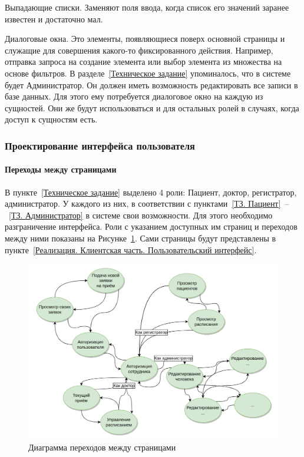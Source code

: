 \documentclass[a4paper,article]{article}
\begin{document}
\begin{sloppypar}
    Выпадающие списки. Заменяют поля ввода, когда список его значений заранее известен и достаточно мал.

    Диалоговые окна. Это элементы, появляющиеся поверх основной страницы и служащие для совершения какого-то фиксированного действия. Например, отправка запроса на создание элемента или выбор элемента из множества на основе фильтров. В разделе~\ref{Техническое задание} упоминалось, что в системе будет Администратор. Он должен иметь возможность редактировать все записи в базе данных. Для этого ему потребуется диалоговое окно на каждую из сущностей. Они же будут использоваться и для остальных ролей в случаях, когда доступ к сущностям есть.

    \subsubsection{Проектирование интерфейса пользователя}
    
    \paragraph{Переходы между страницами}

    В пункте~\ref{Техническое задание} выделено 4 роли: Пациент, доктор, регистратор, администратор. У каждого из них, в соответствии с пунктами~\ref{ТЗ. Пациент}~--~\ref{ТЗ. Администратор} в системе свои возможности. Для этого необходимо разграничение интерфейса. Роли с указанием доступных им страниц и переходов между ними показаны на Рисунке~\ref{fig:Диаграмма переходов между страницами}. Сами страницы будут представлены в пункте~\ref{Реализация. Клиентская часть. Пользовательский интерфейс}.
    
    \begin{figure}[h]
        \centering
        \includegraphics[width=0.9\linewidth]{Диаграмма переходов между страницами.png}
        \caption{\centering Диаграмма переходов между страницами}
        \label{fig:Диаграмма переходов между страницами}
    \end{figure}
    

\end{sloppypar}
\end{document}
